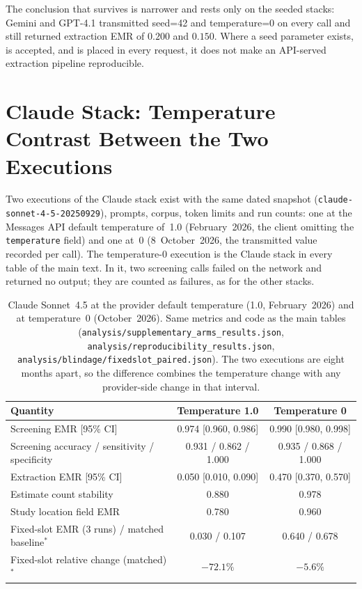 \documentclass[11pt]{article}
\newenvironment{fittab}{\begin{lrbox}{\fittabbox}}{\end{lrbox}%
  \ifdim\wd\fittabbox>\linewidth\resizebox{\linewidth}{!}{\usebox{\fittabbox}}\else\usebox{\fittabbox}\fi}
\begin{document}
\noindent The conclusion that survives is narrower and rests only on the seeded stacks: Gemini and GPT-4.1 transmitted seed=42 and temperature=0 on every call and still returned extraction EMR of $0.200$ and $0.150$. Where a seed parameter exists, is accepted, and is placed in every request, it does not make an API-served extraction pipeline reproducible.

\section{Claude Stack: Temperature Contrast Between the Two Executions}
\label{sec:temp_contrast}

Two executions of the Claude stack exist with the same dated snapshot (\texttt{claude-sonnet-4-5-20250929}), prompts, corpus, token limits and run counts: one at the Messages API default temperature of~1.0 (February~2026, the client omitting the \texttt{temperature} field) and one at~0 (8~October~2026, the transmitted value recorded per call). The temperature-0 execution is the Claude stack in every table of the main text. In it, two screening calls failed on the network and returned no output; they are counted as failures, as for the other stacks.

\begin{table}[htbp]
\centering
\caption{Claude Sonnet~4.5 at the provider default temperature (1.0, February~2026) and at temperature~0 (October~2026). Same metrics and code as the main tables (\texttt{analysis/supplementary\_arms\_results.json}, \texttt{analysis/reproducibility\_results.json}, \texttt{analysis/blindage/fixedslot\_paired.json}). The two executions are eight months apart, so the difference combines the temperature change with any provider-side change in that interval.}
\label{tab:temp_contrast}
\begin{fittab}\begin{tabular}{lcc}
\toprule
\textbf{Quantity} & \textbf{Temperature 1.0} & \textbf{Temperature 0} \\
\midrule
Screening EMR [95\% CI]            & 0.974 [0.960, 0.986] & 0.990 [0.980, 0.998] \\
Screening accuracy / sensitivity / specificity & 0.931 / 0.862 / 1.000 & 0.935 / 0.868 / 1.000 \\
Extraction EMR [95\% CI]           & 0.050 [0.010, 0.090] & 0.470 [0.370, 0.570] \\
Estimate count stability           & 0.880 & 0.978 \\
Study location field EMR           & 0.780 & 0.960 \\
Fixed-slot EMR (3 runs) / matched baseline$^{*}$ & 0.030 / 0.107 & 0.640 / 0.678 \\
Fixed-slot relative change (matched)$^{*}$ & $-72.1\%$ & $-5.6\%$ \\
\bottomrule
\end{tabular}\end{fittab}
\end{table}
\end{document}
